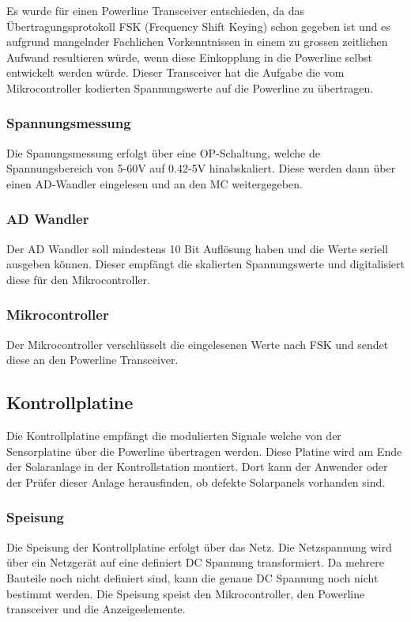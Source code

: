 Es wurde für einen Powerline Transceiver entschieden, da das Übertragungsprotokoll FSK (Frequency Shift Keying) schon gegeben ist und es aufgrund mangelnder Fachlichen Vorkenntnissen in einem zu grossen zeitlichen Aufwand resultieren würde, wenn diese Einkopplung in die Powerline selbst entwickelt werden würde. 
Dieser Transceiver hat die Aufgabe die vom Mikrocontroller kodierten Spannungswerte auf die Powerline zu übertragen.

\subsubsection{Spannungsmessung}

Die Spanungsmessung erfolgt über eine OP-Schaltung, welche de Spannungsbereich von 5-60V auf 0.42-5V hinabskaliert. Diese werden dann über einen AD-Wandler eingelesen und an den MC weitergegeben.

\subsubsection{AD Wandler}

Der AD Wandler soll mindestens 10 Bit Auflösung haben und die Werte seriell ausgeben können. Dieser empfängt die skalierten Spannungswerte und digitalisiert diese für den Mikrocontroller.

\subsubsection{Mikrocontroller}

Der Mikrocontroller verschlüsselt die eingelesenen Werte nach FSK und sendet diese an den Powerline Transceiver.

\subsection{Kontrollplatine}

Die Kontrollplatine empfängt die modulierten Signale welche von der Sensorplatine über die Powerline übertragen werden. Diese Platine wird am Ende der Solaranlage in der Kontrollstation montiert. Dort kann der Anwender oder der Prüfer dieser Anlage herausfinden, ob defekte Solarpanels vorhanden sind.

\subsubsection{Speisung}
Die Speisung der Kontrollplatine erfolgt über das Netz. Die Netzspannung wird über ein Netzgerät auf eine definiert DC Spannung transformiert. 
Da mehrere Bauteile noch nicht definiert sind, kann die genaue DC Spannung noch nicht bestimmt werden. Die Speisung speist den Mikrocontroller, den Powerline transceiver und die Anzeigeelemente.

